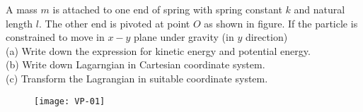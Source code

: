 \begin{exercise}
 A mass $m$ is attached to one end of spring with spring constant $k$ and natural length $l$. The other end is pivoted at point $O$ as shown in figure. If the particle is constrained to move in $x-y$ plane under gravity (in $y$ direction)\\
 (a) Write down the expression for kinetic energy and potential energy.\\
 (b) Write down Lagarngian in Cartesian coordinate system.\\
 (c) Transform the Lagrangian in suitable coordinate system.\\
 \begin{figure}[H]
 	\centering
 	\texttt{[image: VP-01]}
 \end{figure}
\end{exercise}
